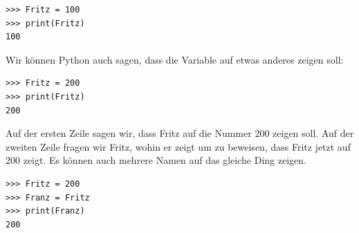 \begin{Verbatim}[frame=single]
>>> Fritz = 100
>>> print(Fritz)
100
\end{Verbatim}
Wir können Python auch sagen, dass die Variable  auf etwas anderes zeigen soll:

\begin{Verbatim}[frame=single]
>>> Fritz = 200
>>> print(Fritz)
200
\end{Verbatim}

\noindent
Auf der ersten Zeile sagen wir, dass Fritz auf die Nummer $200$ zeigen soll. Auf der zweiten Zeile fragen wir Fritz, wohin er zeigt um zu beweisen, dass Fritz jetzt auf $200$ zeigt. Es können auch mehrere Namen auf das gleiche Ding zeigen.

\begin{Verbatim}[frame=single]
>>> Fritz = 200
>>> Franz = Fritz
>>> print(Franz)
200
\end{Verbatim}

